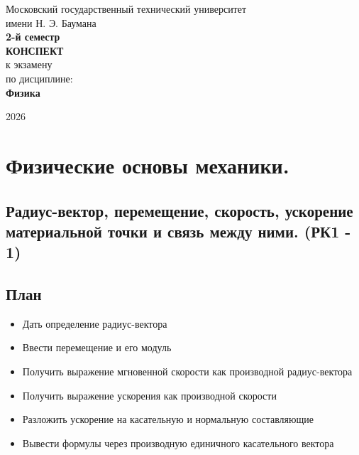 \documentclass[a4paper,12pt]{article}
\begin{document}
\begin{titlepage}
    \begin{center}
        \large Московский государственный технический университет\\
        имени Н. Э. Баумана\\[1cm]
        
        \textbf{2-й семестр}\\[5cm] 
        
        {\LARGE \textbf{КОНСПЕКТ}}\\[0.5cm]
        {\Large к экзамену}\\[2cm]
        
        {\large по дисциплине:}\\[0.3cm]
        {\Large \textbf{Физика}}\\[3cm]
    \end{center}
    
    \hfill 
        
    
    \vfill
    
    \begin{center}
        2026
    \end{center}
\end{titlepage}

\tableofcontents
\newpage

\section{Физические основы механики.}

\subsection{Радиус-вектор, перемещение, скорость, ускорение материальной точки и связь между ними. (РК1 - 1)}

\subsection*{План}
\begin{itemize}
\item Дать определение радиус-вектора
\item Ввести перемещение и его модуль
\item Получить выражение мгновенной скорости как производной радиус-вектора
\item Получить выражение ускорения как производной скорости
\item Разложить ускорение на касательную и нормальную составляющие
\item Вывести формулы через производную единичного касательного вектора
\end{itemize}
    
\end{document}
